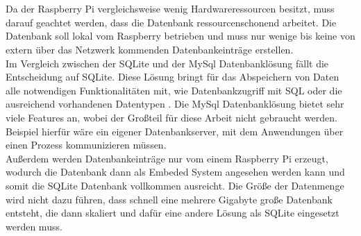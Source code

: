 \\\\Da der Raspberry Pi vergleichsweise wenig Hardwareressourcen besitzt, muss darauf geachtet werden, dass die Datenbank ressourcenschonend arbeitet. Die Datenbank soll lokal vom Raspberry betrieben und muss nur wenige bis keine von extern über das Netzwerk kommenden Datenbankeinträge erstellen.\\Im Vergleich zwischen der SQLite und der MySql Datenbanklösung fällt die Entscheidung auf SQLite. Diese Lösung bringt für das Abspeichern von Daten alle notwendigen Funktionalitäten mit, wie Datenbankzugriff mit \acf{SQL} oder die ausreichend vorhandenen Datentypen \cite{sqlite:sqlite2}. Die MySql Datenbanklösung bietet sehr viele Features an, wobei der Großteil für diese Arbeit nicht gebraucht werden. Beispiel hierfür wäre ein eigener Datenbankserver, mit dem Anwendungen über einen Prozess kommunizieren müssen. \\Außerdem werden Datenbankeinträge nur vom einem Raspberry Pi erzeugt, wodurch die Datenbank dann als Embeded System angesehen werden kann und somit die SQLite Datenbank vollkommen ausreicht. Die Größe der Datenmenge wird nicht dazu führen, dass schnell eine mehrere Gigabyte große Datenbank entsteht, die dann skaliert  und dafür eine andere Lösung als SQLite eingesetzt werden muss.\cite{sqlite:sqlite}


